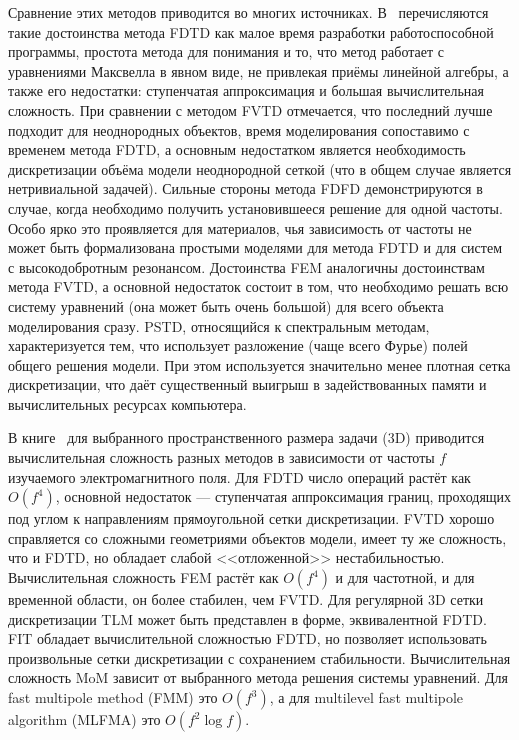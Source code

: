 Сравнение этих методов приводится во многих источниках.
В~\cite{Inan-FDTD-2011} перечисляются такие достоинства метода FDTD
как малое время разработки работоспособной программы, простота метода
для понимания и то, что метод работает с уравнениями Максвелла в явном
виде, не привлекая приёмы линейной алгебры, а также его недостатки:
ступенчатая аппроксимация и большая вычислительная сложность.  При
сравнении с методом FVTD отмечается, что последний лучше подходит для
неоднородных объектов, время моделирования сопоставимо с временем
метода FDTD, а основным недостатком является необходимость
дискретизации объёма модели неоднородной сеткой (что в общем случае
является нетривиальной задачей).  Сильные стороны метода FDFD
демонстрируются в случае, когда необходимо получить установившееся
решение для одной частоты.  Особо ярко это проявляется для материалов,
чья зависимость от частоты не может быть формализована простыми
моделями для метода FDTD и для систем с высокодобротным резонансом.
Достоинства FEM аналогичны достоинствам метода FVTD, а основной
недостаток состоит в том, что необходимо решать всю систему уравнений
(она может быть очень большой) для всего объекта моделирования сразу.
PSTD, относящийся к спектральным методам, характеризуется тем, что
использует разложение (чаще всего Фурье) полей общего решения модели.
При этом используется значительно менее плотная сетка дискретизации,
что даёт существенный выигрыш в задействованных памяти и
вычислительных ресурсах компьютера.

В книге~\cite{Bondenson-CEM-2005} для выбранного пространственного
размера задачи (3D) приводится вычислительная сложность разных методов
в зависимости от частоты $f$ изучаемого электромагнитного поля.  Для
FDTD число операций растёт как $O(f^4)$, основной недостаток ---
ступенчатая аппроксимация границ, проходящих под углом к направлениям
прямоугольной сетки дискретизации.  FVTD хорошо справляется со
сложными геометриями объектов модели, имеет ту же сложность, что и
FDTD, но обладает слабой <<отложенной>> нестабильностью.
Вычислительная сложность FEM растёт как $O(f^4)$ и для частотной, и
для временной области, он более стабилен, чем FVTD.  Для регулярной 3D
сетки дискретизации TLM может быть представлен в форме, эквивалентной
FDTD.  FIT обладает вычислительной сложностью FDTD, но позволяет
использовать произвольные сетки дискретизации с сохранением
стабильности.  Вычислительная сложность MoM зависит от выбранного
метода решения системы уравнений.  Для fast multipole method (FMM) это
$O(f^3)$, а для multilevel fast multipole algorithm (MLFMA) это
$O(f^2\log f)$.


